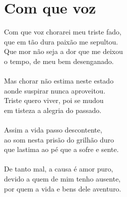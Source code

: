 \documentclass{article}
\begin{document}
\section{ Com que voz}
Com que voz chorarei meu triste fado,\\
que em tão dura paixão me sepultou.\\
Que mor não seja a dor que me deixou\\
o tempo, de meu bem desenganado.\\
\\
Mas chorar não estima neste estado\\
aonde suspirar nunca aproveitou.\\
Triste quero viver, poi se mudou\\
em tisteza a alegria do passado.\\
\\
Assim a vida passo descontente,\\
ao som nesta prisão do grilhão duro\\
que lastima ao pé que a sofre e sente.\\
\\
De tanto mal, a causa é amor puro,\\
devido a quem de mim tenho ausente,\\
por quem a vida e bens dele aventuro.\\
\\
\\
\end{document}
